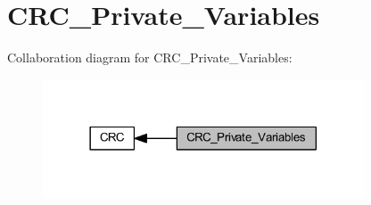 \hypertarget{group___c_r_c___private___variables}{}\section{C\+R\+C\+\_\+\+Private\+\_\+\+Variables}
\label{group___c_r_c___private___variables}
Collaboration diagram for C\+R\+C\+\_\+\+Private\+\_\+\+Variables\+:
\nopagebreak
\begin{figure}[H]
\begin{center}
\leavevmode
\includegraphics[width=270pt]{group___c_r_c___private___variables}
\end{center}
\end{figure}
